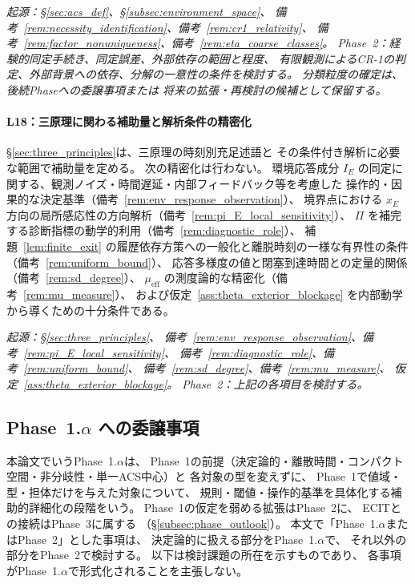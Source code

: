 \medskip
\noindent\textit{起源：\S\ref{sec:acs_def}、\S\ref{subsec:environment_space}、
備考~\ref{rem:necessity_identification}、備考~\ref{rem:cr1_relativity}、
備考~\ref{rem:factor_nonuniqueness}、備考~\ref{rem:eta_coarse_classes}。
Phase~2：経験的同定手続き、同定誤差、外部依存の範囲と程度、
有限観測によるCR-1の判定、外部背景への依存、分解の一意性の条件を検討する。
分類粒度の確定は、後続Phaseへの委譲事項または
将来の拡張・再検討の候補として保留する。}

\paragraph{L18：三原理に関わる補助量と解析条件の精密化}
\label{lim:L18}
\S\ref{sec:three_principles}は、三原理の時刻別充足述語と
その条件付き解析に必要な範囲で補助量を定める。
次の精密化は行わない。
環境応答成分 $I_E$ の同定に関する、観測ノイズ・時間遅延・内部フィードバック等を考慮した
操作的・因果的な決定基準（備考~\ref{rem:env_response_observation}）、
境界点における $x_E$ 方向の局所感応性の方向解析（備考~\ref{rem:pi_E_local_sensitivity}）、
$\Pi$ を補完する診断指標の動学的利用（備考~\ref{rem:diagnostic_role}）、
補題~\ref{lem:finite_exit} の履歴依存方策への一般化と離脱時刻の一様な有界性の条件
（備考~\ref{rem:uniform_bound}）、
応答多様度の値と閉塞到達時間との定量的関係（備考~\ref{rem:sd_degree}）、
$\mu_{\mathrm{eff}}$ の測度論的な精密化（備考~\ref{rem:mu_measure}）、
および仮定~\ref{ass:theta_exterior_blockage} を内部動学から導くための十分条件である。

\medskip
\noindent\textit{起源：\S\ref{sec:three_principles}、
備考~\ref{rem:env_response_observation}、備考~\ref{rem:pi_E_local_sensitivity}、
備考~\ref{rem:diagnostic_role}、備考~\ref{rem:uniform_bound}、
備考~\ref{rem:sd_degree}、備考~\ref{rem:mu_measure}、
仮定~\ref{ass:theta_exterior_blockage}。
Phase~2：上記の各項目を検討する。}

\subsection{Phase~1.$\alpha$ への委譲事項}
\label{subsec:phase1a}

本論文でいうPhase~1.$\alpha$は、
Phase~1の前提（決定論的・離散時間・コンパクト空間・非分岐性・単一ACS中心）と
各対象の型を変えずに、
Phase~1で値域・型・担体だけを与えた対象について、
規則・閾値・操作的基準を具体化する補助的詳細化の段階をいう。
Phase~1の仮定を弱める拡張はPhase~2に、
ECITとの接続はPhase~3に属する
（\S\ref{subsec:phase_outlook}）。
本文で「Phase~1.$\alpha$またはPhase~2」とした事項は、
決定論的に扱える部分をPhase~1.$\alpha$で、
それ以外の部分をPhase~2で検討する。
以下は検討課題の所在を示すものであり、
各事項がPhase~1.$\alpha$で形式化されることを主張しない。

